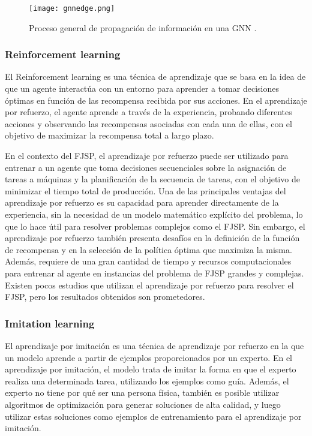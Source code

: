 \begin{figure}[ht]
    \centering
    \texttt{[image: gnnedge.png]}
    \caption{Proceso general de propagación de información en una GNN \cite{DeepFindr_2021}.}
    \label{fig:gnn-edge}
\end{figure}
 
\subsubsection{Reinforcement learning}
El Reinforcement learning\cite{Bhatt_2018}\cite{Huggingface_DeepRL} es una técnica de aprendizaje que se basa en la idea de que un agente 
interactúa con un entorno para aprender a tomar decisiones óptimas en función de las recompensa 
recibida por sus acciones. En el aprendizaje por refuerzo, el agente aprende a través de la 
experiencia, probando diferentes acciones y observando las recompensas asociadas con cada una 
de ellas, con el objetivo de maximizar la recompensa total a largo plazo.\medskip

En el contexto del FJSP, el aprendizaje por refuerzo puede ser utilizado para entrenar a un 
agente que toma decisiones secuenciales sobre la asignación de tareas a máquinas y la 
planificación de la secuencia de tareas, con el objetivo de minimizar el tiempo total de producción. 
Una de las principales ventajas del aprendizaje por refuerzo es su capacidad para aprender directamente 
de la experiencia, sin la necesidad de un modelo matemático explícito del problema, lo que lo hace 
útil para resolver problemas complejos como el FJSP. Sin embargo, el aprendizaje 
por refuerzo también presenta desafíos en la definición de la función de recompensa y en la 
selección de la política óptima que maximiza la misma. Además, requiere de una gran cantidad de tiempo 
y recursos computacionales para entrenar al agente en instancias del problema de FJSP grandes y complejas.
Existen pocos estudios que utilizan el aprendizaje por refuerzo para resolver el FJSP, pero los resultados
obtenidos son prometedores.

\subsubsection{Imitation learning}
El aprendizaje por imitación es una técnica de aprendizaje por refuerzo en la que un modelo aprende
a partir de ejemplos proporcionados por un experto. En el aprendizaje por imitación, el modelo trata
de imitar la forma en que el experto realiza una determinada tarea, utilizando los ejemplos como guía.
Además, el experto no tiene por qué ser una persona física, también es posible utilizar algoritmos de
optimización para generar soluciones de alta calidad, y luego utilizar estas soluciones como ejemplos
de entrenamiento para el aprendizaje por imitación.\medskip

